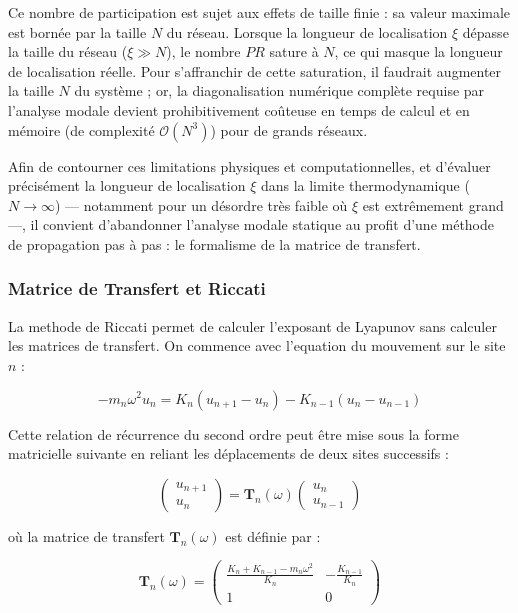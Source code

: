 \documentclass[11pt, a4paper, twoside]{article}
\begin{document}
Ce nombre de participation est sujet aux effets de taille finie : sa valeur maximale est bornée par la taille $N$ du réseau. Lorsque la longueur de localisation $\xi$ dépasse la taille du réseau ($\xi \gg N$), le nombre $PR$ sature à $N$, ce qui masque la longueur de localisation réelle. Pour s'affranchir de cette saturation, il faudrait augmenter la taille $N$ du système ; or, la diagonalisation numérique complète requise par l'analyse modale devient prohibitivement coûteuse en temps de calcul et en mémoire (de complexité $\mathcal{O}(N^3)$) pour de grands réseaux.

Afin de contourner ces limitations physiques et computationnelles, et d'évaluer précisément la longueur de localisation $\xi$ dans la limite thermodynamique ($N \to \infty$) — notamment pour un désordre très faible où $\xi$ est extrêmement grand —, il convient d'abandonner l'analyse modale statique au profit d'une méthode de propagation pas à pas : le formalisme de la matrice de transfert.


\subsubsection{Matrice de Transfert et Riccati}\label{subsubsec:riccati}

La methode de Riccati permet de calculer l'exposant de Lyapunov sans calculer les matrices de transfert. On commence avec l'equation du mouvement sur le site $n$ :

\begin{equation*}
    -m_n \omega^2 u_n = K_n(u_{n+1} - u_n) - K_{n-1}(u_n - u_{n-1})
\end{equation*}

Cette relation de récurrence du second ordre peut être mise sous la forme matricielle suivante en reliant les déplacements de deux sites successifs :

\begin{equation}\label{eq:transfer_relation}
    \begin{pmatrix} u_{n+1} \\ u_n \end{pmatrix} = \mathbf{T}_n(\omega) \begin{pmatrix} u_n \\ u_{n-1} \end{pmatrix}
\end{equation}

où la matrice de transfert $\mathbf{T}_n(\omega)$ est définie par :

\begin{equation}\label{eq:transfer_matrix_def}
    \mathbf{T}_n(\omega) = \begin{pmatrix} \frac{K_n + K_{n-1} - m_n \omega^2}{K_n} & -\frac{K_{n-1}}{K_n} \\ 1 & 0 \end{pmatrix}
\end{equation}
\end{document}
